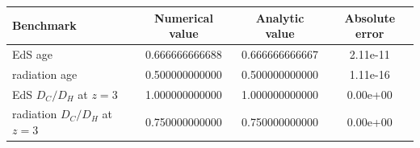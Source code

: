 \begin{tabular}{lccc}
\toprule
Benchmark & Numerical value & Analytic value & Absolute error \\
\midrule
EdS age & 0.666666666688 & 0.666666666667 & 2.11e-11 \\
radiation age & 0.500000000000 & 0.500000000000 & 1.11e-16 \\
EdS $D_C/D_H$ at $z=3$ & 1.000000000000 & 1.000000000000 & 0.00e+00 \\
radiation $D_C/D_H$ at $z=3$ & 0.750000000000 & 0.750000000000 & 0.00e+00 \\
\bottomrule
\end{tabular}